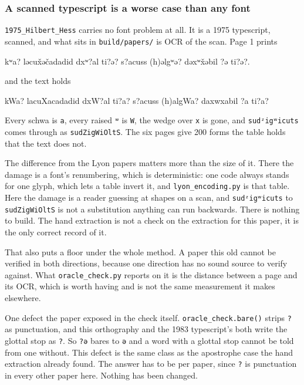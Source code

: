 \subsubsection{A scanned typescript is a worse case than any font}

\texttt{1975\_\allowbreak{}Hilbert\_\allowbreak{}Hess} carries no font problem at all. It is a 1975 typescript, scanned, and what sits in \texttt{build/\allowbreak{}papers/\allowbreak{}} is OCR of the scan. Page 1 prints

kʷa? ləcux̌əčadadid dxʷ?al ti?ə? s?acuss (h)əlgʷə? dəxʷx̌əbil ?ə ti?ə?.

and the text holds

kWa? lacuXacadadid dxW?al ti?a? s?acuss (h)algWa? daxwxabil ?a ti?a?

Every schwa is \texttt{a}, every raised \texttt{ʷ} is \texttt{W}, the wedge over \texttt{x} is gone, and \texttt{sudᶻigʷicuts} comes through as \texttt{sud\allowbreak{}Zig\allowbreak{}Wi\allowbreak{}Olt\allowbreak{}S}. The six pages give 200 forms the table holds that the text does not.

The difference from the Lyon papers matters more than the size of it. There the damage is a font's renumbering, which is deterministic: one code always stands for one glyph, which lets a table invert it, and \texttt{lyon\_\allowbreak{}encoding.\allowbreak{}py} is that table. Here the damage is a reader guessing at shapes on a scan, and \texttt{sudᶻigʷicuts} to \texttt{sud\allowbreak{}Zig\allowbreak{}Wi\allowbreak{}Olt\allowbreak{}S} is not a substitution anything can run backwards. There is nothing to build. The hand extraction is not a check on the extraction for this paper, it is the only correct record of it.

That also puts a floor under the whole method. A paper this old cannot be verified in both directions, because one direction has no sound source to verify against. What \texttt{oracle\_\allowbreak{}check.\allowbreak{}py} reports on it is the distance between a page and its OCR, which is worth having and is not the same measurement it makes elsewhere.

One defect the paper exposed in the check itself. \texttt{oracle\_\allowbreak{}check.\allowbreak{}bare()} strips \texttt{?} as punctuation, and this orthography and the 1983 typescript's both write the glottal stop as \texttt{?}. So \texttt{?ə} bares to \texttt{ə} and a word with a glottal stop cannot be told from one without. This defect is the same class as the apostrophe case the hand extraction already found. The answer has to be per paper, since \texttt{?} is punctuation in every other paper here. Nothing has been changed.

